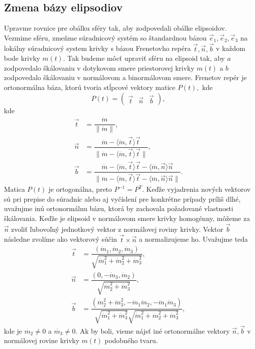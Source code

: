 \subsection{Zmena bázy elipsodiov}
Upravme rovnice pre obálku sféry tak, aby zodpovedali obálke elipsoidov. Vezmime sféru, zmeňme súradnicový systém so štandardnou bázou  $\vec{e}_1, \vec{e}_2, \vec{e}_3$ na lokálny súradnicový system krivky s bázou Frenetovho repéra $\vec{t}, \vec{n}, \vec{b}$ v každom bode krivky $m(t).$ Tak budeme môcť upraviť sféru na elipsoid tak, aby $a$ zodpovedalo škálovaniu v dotykovom smere priestorovej krivky $m(t)$ a $b$ zodpovedalo škálovaniu v normálovom a binormálovom smere. Frenetov repér je ortonormálna báza, ktorú tvoria stĺpcové vektory matice $P(t),$ kde
$$
P(t) = \left( \begin{matrix} \vec{t} & \vec{n} & \vec{b} \end{matrix} \right),
$$
kde
\begin{align*}
\vec{t} &= \dfrac{\dot{m}}{\| \dot{m} \|}, \\
\vec{n} &= \dfrac{\ddot{m} - \langle \ddot{m}, \vec{t} \rangle \vec{t}}{\| \ddot{m} - \langle \ddot{m}, \vec{t} \rangle \vec{t}\| }, \\
\vec{b} &= \dfrac{\dddot{m} - \langle \dddot{m}, \vec{t} \rangle \vec{t} - \langle \dddot{m}, \vec{n} \rangle \vec{n}}{\| \dddot{m} - \langle \dddot{m}, \vec{t} \rangle \vec{t} - \langle \dddot{m}, \vec{n} \rangle \vec{n} \| }.
\end{align*}
Matica $P(t)$ je ortogonálna, preto $P^{-1} = P^T.$
Keďže vyjadrenia nových vektorov sú pri prepise do súradníc alebo aj vyčíslení pre konkrétne prípady príliš dlhé, uvažujme inú ortonormálnu bázu, ktorá by zachovala požadované vlastnosti škálovania. Keďže je elipsoid v normálovom smere krivky homogénny, môžeme za $\vec{n}$ zvoliť ľubovoľný jednotkový vektor z normálovej roviny krivky. Vektor $\vec{b}$ následne zvolíme ako vektorový súčin $\vec{t} \times \vec{n}$ a normalizujeme ho. Uvažujme teda
\begin{align*}
\vec{t} &= \dfrac{(\dot{m}_1, \dot{m}_2, \dot{m}_3)}{\sqrt{\dot{m}_1^2 + \dot{m}_2^2 + \dot{m}_3^2}}, \\
\vec{n} &= \dfrac{(0, -\dot{m}_3, \dot{m}_2)}{\sqrt{\dot{m}_2^2 + \dot{m}_3^2}}, \\
\vec{b} &= \dfrac{(\dot{m}_2^2 + \dot{m}_3^2, -\dot{m}_1 \dot{m}_2, -\dot{m}_1 \dot{m}_3)}{\sqrt{\dot{m}_1^2 + \dot{m}_3^2}\sqrt{\dot{m}_1^2 + \dot{m}_2^2 + \dot{m}_3^2}},
\end{align*}
kde je $\dot{m_2} \neq 0$ a $\dot{m_3} \neq 0$. Ak by boli, vieme nájsť iné ortonormálne vektory $\vec{n}, \vec{b}$ v normálovej rovine krivky $m(t)$ podobného tvaru. 


